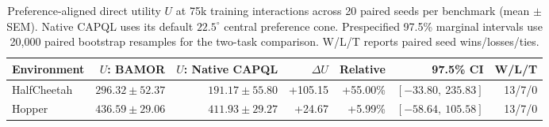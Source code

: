 \begin{table}[!htbp]
\centering\small\setlength{\tabcolsep}{4.5pt}
\caption{Preference-aligned direct utility $U$ at 75k training interactions across 20 paired seeds per benchmark (mean $\pm$ SEM). Native CAPQL uses its default $22.5^\circ$ central preference cone. Prespecified 97.5\% marginal intervals use 20,000 paired bootstrap resamples for the two-task comparison. W/L/T reports paired seed wins/losses/ties.}
\label{tab:utility_confirmation}
\begin{tabular}{@{}lrrrrrr@{}}
\toprule
Environment & $U$: BAMOR & $U$: Native CAPQL & $\Delta U$ & Relative & 97.5\% CI & W/L/T \\
\midrule
HalfCheetah & $296.32{\pm}52.37$ & $191.17{\pm}55.80$ & +105.15 & +55.00\% & $[-33.80,\ 235.83]$ & 13/7/0 \\
Hopper & $436.59{\pm}29.06$ & $411.93{\pm}29.27$ & +24.67 & +5.99\% & $[-58.64,\ 105.58]$ & 13/7/0 \\
\bottomrule
\end{tabular}
\end{table}
